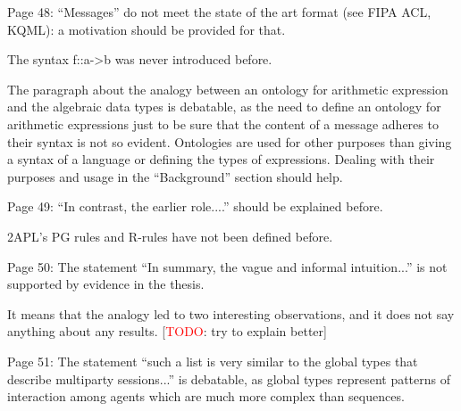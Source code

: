 \documentclass{article}
\newcommand{\todo}[1]{[\textcolor{red}{TODO}: #1]}
\newenvironment{them}{\noindent\begingroup\color{blue}}{\endgroup\par}
\begin{document}
\begin{them}

Page 48:
“Messages” do not meet the state of the art format (see FIPA ACL, KQML): a
motivation should be provided for that.

\end{them}
\todo{?}

\begin{them}

The syntax f::a->b was never introduced before.
\end{them}
\todo{?}

\begin{them}

The paragraph about the analogy between an ontology for arithmetic expression
and the algebraic data types is debatable, as the need to define an ontology
for arithmetic expressions just to be sure that the content of a message
adheres to their syntax is not so evident. Ontologies are used for other
purposes than giving a syntax of a language or defining the types of
expressions. Dealing with their purposes and usage in the “Background” section
should help.

\end{them}
\todo{?}

\begin{them}

Page 49:
“In contrast, the earlier role....” should be explained before.
\end{them}
\todo{?}

\begin{them}

2APL's PG rules and R-rules have not been defined before.
\end{them}
\todo{define 2APL's rules}

\begin{them}

Page 50:
The statement “In summary, the vague and informal intuition...” is not
supported by evidence in the thesis.

\end{them}
It means that the analogy led to two interesting observations, and it does not
say anything about any results.
\todo{try to explain better}

\begin{them}

Page 51:
The statement “such a list is very similar to the global types that describe
multiparty sessions...” is debatable, as global types represent patterns of
interaction among agents which are much more complex than sequences.

\end{them}
\todo{?}
\end{document}
